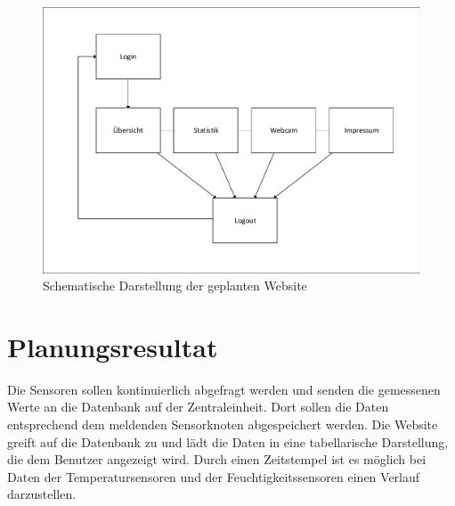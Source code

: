 \begin{figure} [htb]
\begin{centering}
\includegraphics[scale=0.8]{Bilder/struktur_website_einfach.pdf}
\caption[Schematische Darstellung der geplanten Website]{Schematische
Darstellung der geplanten Website}
\label{Darstellung_Website_einfach}
\end{centering}
\end{figure}

\section{Planungsresultat}

Die Sensoren sollen kontinuierlich abgefragt werden und senden die gemessenen Werte an
die Datenbank auf der Zentraleinheit. Dort sollen die Daten entsprechend dem
meldenden Sensorknoten abgespeichert werden. Die Website greift auf die Datenbank zu
und lädt die Daten in eine tabellarische Darstellung, die dem Benutzer angezeigt wird. Durch einen Zeitstempel ist es möglich bei Daten der Temperatursensoren
und der Feuchtigkeitssensoren einen Verlauf darzustellen.
